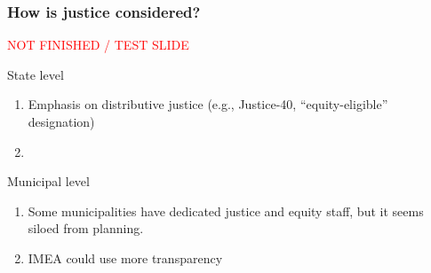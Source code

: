 \begin{frame}
    \frametitle{How is justice considered?}
    \textcolor{red}{NOT FINISHED / TEST SLIDE}
    \begin{block}{State level}
        \begin{enumerate}
            \item Emphasis on distributive justice (e.g., Justice-40, ``equity-eligible'' designation)
            \item 
        \end{enumerate}
        
    \end{block}
    \begin{block}{Municipal level}
        \begin{enumerate}
            \item Some municipalities have dedicated justice and equity staff, but it seems siloed from planning.
            \item IMEA could use more transparency
        \end{enumerate}
    \end{block}
\end{frame}


